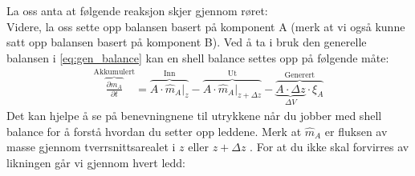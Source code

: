 La oss anta at følgende reaksjon skjer gjennom røret: \\
Videre, la oss sette opp balansen basert på komponent A (merk at vi også kunne satt opp balansen basert på komponent B). Ved å ta i bruk den generelle balansen i \cref{eq:gen_balance} kan en shell balance settes opp på følgende måte:
\begin{equation}
\begin{split}
\label{eq:shellbal}
    \overbrace{\frac{\partial m_A}{\partial t}}^{\text{Akkumulert}} = \overbrace{A \cdot \hat{m}_A\big|_z}^{\text{Inn}} - \overbrace{A \cdot \hat{m}_A\big|_{z+\Delta z}}^{\text{Ut}} - \overbrace{\underbrace{A \cdot \Delta z}_\text{$\Delta V$} \cdot \xi_A}^{\text{Generert}} 
\end{split}
\end{equation}
   Det kan hjelpe å se på benevningnene til utrykkene når du jobber med shell balance for å forstå hvordan du setter opp leddene. Merk at $\hat{m}_A$ er fluksen av masse gjennom tverrsnittsarealet i $z$ eller $z + \Delta z$ . For at du ikke skal forvirres av likningen går vi gjennom hvert ledd:
   
